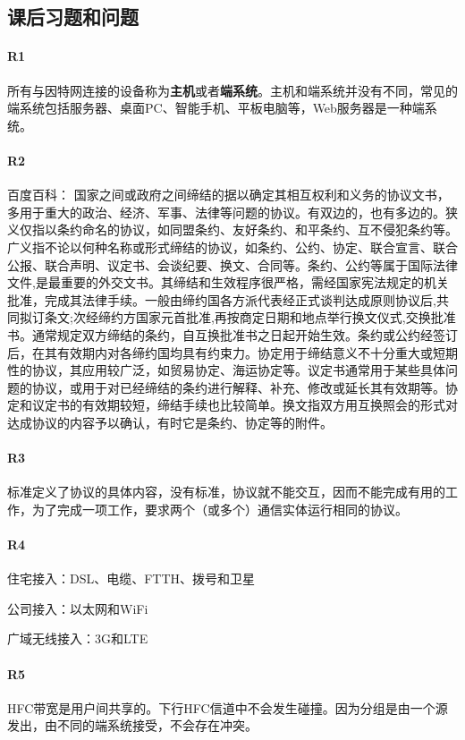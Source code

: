 ﻿\subsection*{课后习题和问题}

\paragraph*{R1}所有与因特网连接的设备称为\textbf{主机}或者\textbf{端系统}。主机和端系统并没有不同，常见的端系统包括服务器、桌面PC、智能手机、平板电脑等，Web服务器是一种端系统。

\paragraph*{R2}百度百科： 国家之间或政府之间缔结的据以确定其相互权利和义务的协议文书，多用于重大的政治、经济、军事、法律等问题的协议。有双边的，也有多边的。狭义仅指以条约命名的协议，如同盟条约、友好条约、和平条约、互不侵犯条约等。广义指不论以何种名称或形式缔结的协议，如条约、公约、协定、联合宣言、联合公报、联合声明、议定书、会谈纪要、换文、合同等。条约、公约等属于国际法律文件,是最重要的外交文书。其缔结和生效程序很严格，需经国家宪法规定的机关批准，完成其法律手续。一般由缔约国各方派代表经正式谈判达成原则协议后,共同拟订条文;次经缔约方国家元首批准,再按商定日期和地点举行换文仪式,交换批准书。通常规定双方缔结的条约，自互换批准书之日起开始生效。条约或公约经签订后，在其有效期内对各缔约国均具有约束力。协定用于缔结意义不十分重大或短期性的协议，其应用较广泛，如贸易协定、海运协定等。议定书通常用于某些具体问题的协议，或用于对已经缔结的条约进行解释、补充、修改或延长其有效期等。协定和议定书的有效期较短，缔结手续也比较简单。换文指双方用互换照会的形式对达成协议的内容予以确认，有时它是条约、协定等的附件。

\paragraph*{R3}标准定义了协议的具体内容，没有标准，协议就不能交互，因而不能完成有用的工作，为了完成一项工作，要求两个（或多个）通信实体运行相同的协议。

\paragraph*{R4}
住宅接入：DSL、电缆、FTTH、拨号和卫星

公司接入：以太网和WiFi

广域无线接入：3G和LTE

\paragraph*{R5}HFC带宽是用户间共享的。下行HFC信道中不会发生碰撞。因为分组是由一个源发出，由不同的端系统接受，不会存在冲突。

